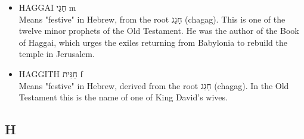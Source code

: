 \begin{itemize}
Possibly means "flight" in Hebrew, though it could also be of unknown Egyptian origin. In the Old Testament she is the second wife of Abraham and the mother of Ishmael, the founder of the Arab people. After Abraham's first wife Sarah finally gave birth to a child, she had Hagar and Ishmael expelled into the desert. However, God heard their crying and saved them.
\item HAGGAI חַגַּי m\\
Means "festive" in Hebrew, from the root חָגַג (chagag). This is one of the twelve minor prophets of the Old Testament. He was the author of the Book of Haggai, which urges the exiles returning from Babylonia to rebuild the temple in Jerusalem.
\item HAGGITH חַגִּית f\\
Means "festive" in Hebrew, derived from the root חָגַג (chagag). In the Old Testament this is the name of one of King David's wives.
\end{itemize}





\subsection{H}

